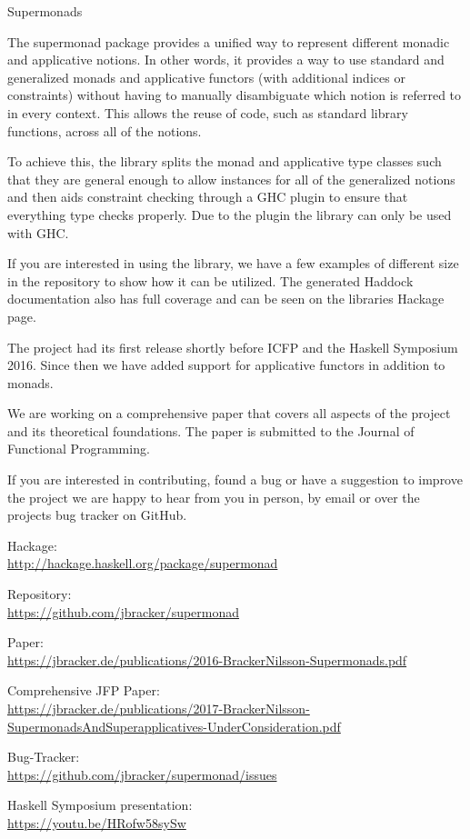 \begin{hcarentry}[updated]{Supermonads}
\label{supermonads}
\makeheader

The supermonad package provides a unified way to represent different monadic
and applicative notions. In other words, it provides a way to use standard and
generalized monads and applicative functors (with additional indices or
constraints) without having to manually disambiguate which notion is referred
to in every context. This allows the reuse of code, such as standard library
functions, across all of the notions.

To achieve this, the library splits the monad and applicative type classes
such that they are general enough to allow instances for all of the
generalized notions and then aids constraint checking through a GHC plugin to
ensure that everything type checks properly. Due to the plugin the library can
only be used with GHC.

If you are interested in using the library, we have a few examples of
different size in the repository to show how it can be utilized. The generated
Haddock documentation also has full coverage and can be seen on the libraries
Hackage page.

The project had its first release shortly before ICFP and the Haskell
Symposium 2016. Since then we have added support for applicative functors in
addition to monads.

We are working on a comprehensive paper that covers all aspects of the project
and its theoretical foundations. The paper is submitted to the Journal of 
Functional Programming.

If you are interested in contributing, found a bug or have a suggestion to
improve the project we are happy to hear from you in person, by email or over
the projects bug tracker on GitHub.

\FurtherReading
\begin{compactitem}
  \item Hackage:\\ \url{http://hackage.haskell.org/package/supermonad}
  \item Repository:\\ \url{https://github.com/jbracker/supermonad}
  \item Paper:\\
    \url{https://jbracker.de/publications/2016-BrackerNilsson-Supermonads.pdf}
  \item Comprehensive JFP Paper:\\
    \url{https://jbracker.de/publications/2017-BrackerNilsson-SupermonadsAndSuperapplicatives-UnderConsideration.pdf}
  \item Bug-Tracker:\\ \url{https://github.com/jbracker/supermonad/issues}
  \item Haskell Symposium presentation:\\ \url{https://youtu.be/HRofw58sySw}
\end{compactitem}
\end{hcarentry}
